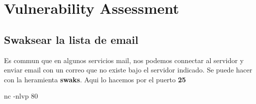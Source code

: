 \documentclass{assets/ipesethesis}
\newenvironment{Shaded}{\begin{snugshade}}{\end{snugshade}}
\newcommand{\ExtensionTok}[1]{#1}
\newcommand{\FunctionTok}[1]{\textcolor[rgb]{0.00,0.00,0.00}{#1}}
\newcommand{\KeywordTok}[1]{\textcolor[rgb]{0.13,0.29,0.53}{\textbf{#1}}}
\newcommand{\NormalTok}[1]{#1}
\newcommand{\OperatorTok}[1]{\textcolor[rgb]{0.81,0.36,0.00}{\textbf{#1}}}
\newcommand{\StringTok}[1]{\textcolor[rgb]{0.31,0.60,0.02}{#1}}
\newcommand{\VariableTok}[1]{\textcolor[rgb]{0.00,0.00,0.00}{#1}}
\begin{document}
\begin{Shaded}
\end{Shaded}

\hypertarget{vulnerability-assessment-4}{%
\section*{Vulnerability Assessment}\label{vulnerability-assessment-4}}

\hypertarget{swaksear-la-lista-de-email}{%
\subsection*{Swaksear la lista de email}\label{swaksear-la-lista-de-email}}

Es commun que en algunos servicios mail, nos podemos connectar al servidor y enviar email con un correo que no existe bajo el servidor indicado.
Se puede hacer con la heramienta \textbf{swaks}. Aqui lo hacemos por el puerto \textbf{25}

\begin{Shaded}
\begin{Highlighting}[]
\ExtensionTok{nc}\NormalTok{ -nlvp 80}
\end{Highlighting}
\end{Shaded}

\begin{Shaded}
\end{Shaded}
\end{document}
